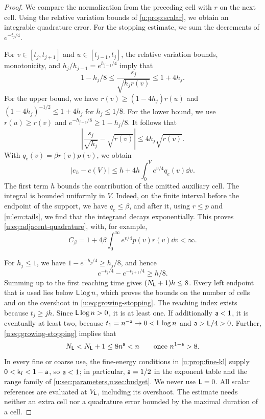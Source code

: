 \begin{proof}
We compare the normalization from the preceding cell with $r$ on the
next cell. Using the relative variation bounds of \cref{u:prop:scalar}, we
obtain an integrable quadrature error. For the stopping estimate, we
sum the decrements of $e^{-t_j/4}$.

For $v\in[t_j,t_{j+1}]$ and $u\in[t_{j-1},t_j]$, the relative
variation bounds, monotonicity, and
$h_j/h_{j-1}=e^{h_{j-1}/4}$ imply that
\begin{equation}\label{u:eq:adjacent-ratio}
 1-h_j/8\le\frac{s_j}{\sqrt{h_jr(v)}}\le1+4h_j.
\end{equation}
For the upper bound, we have $r(v)\ge(1-4h_j)r(u)$ and
$(1-4h_j)^{-1/2}\le1+4h_j$ for $h_j\le1/8$.
For the lower bound, we use $r(u)\ge r(v)$ and
$e^{-h_{j-1}/8}\ge1-h_j/8$. It follows that
\[
 \left|\frac{s_j}{\sqrt{h_j}}-\sqrt{r(v)}\right|
       \le4h_j\sqrt{r(v)}.
\]
With $q_e(v)=\beta r(v)p(v)$, we obtain
\begin{equation}\label{u:eq:quadrature-error}
 |e_h-e(V)|\le h+4h\int_0^V e^{v/4}q_e(v)\dd v.
\end{equation}
The first term $h$ bounds the contribution of the omitted auxiliary cell. The integral is
bounded uniformly in $V$. Indeed, on the finite interval before the endpoint of the support, we have
$q_e\le\beta$, and after it, using $r\le p$ and \cref{u:lem:tails},
we find that the integrand decays exponentially. This proves
\eqref{u:eq:adjacent-quadrature}, with, for example,
\[
 C_\beta=1+4\beta\int_0^\infty e^{v/4}p(v)r(v)\dd v<\infty.
\]

For $h_j\le1$, we have $1-e^{-h_j/4}\ge h_j/8$, and hence
\[
 e^{-t_j/4}-e^{-t_{j+1}/4}\ge h/8.
\]
Summing up to the first reaching time gives
$(N_{\mathsf{L}}+1)h\le8$. Every left endpoint that is used lies below
$\mathsf{L}\log n$, which proves the bounds on the number of cells and on the overshoot in
\eqref{u:eq:growing-stopping}. The reaching index exists because
$t_j\ge jh$. Since $\mathsf{L}\log n>0$, it is at least one.
If additionally $\mathsf{a}<1$, it is eventually at least two, because
$t_1=n^{-\mathsf{a}}\to0<\mathsf{L}\log n$ and
$\mathsf{a}>\mathsf{L}/4>0$. Further,
\eqref{u:eq:growing-stopping} implies that
\[
 N_{\mathsf{L}}<N_{\mathsf{L}}+1\le8n^{\mathsf{a}}<n
 \qquad\text{once }n^{1-\mathsf{a}}>8.
\]
In every fine or coarse use, the fine-energy conditions in
\cref{u:prop:fine-kl} supply $0<\mathsf{k}_{\rm f}<1-\mathsf{a}$, so
$\mathsf{a}<1$; in particular, $\mathsf{a}=1/2$ in the exponent table and
the range family of \cref{u:sec:parameters,u:sec:budget}.
We never use $\mathsf{L}=0$. All scalar references are
evaluated at $V_{\mathsf{L}}$, including its overshoot. The estimate needs neither an extra cell nor a quadrature error
bounded by the maximal duration of a cell.
\end{proof}

